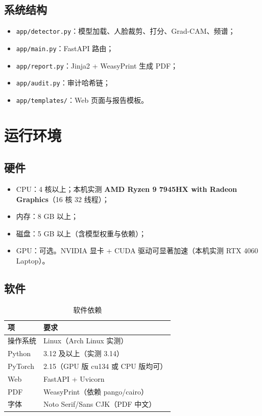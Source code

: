 \documentclass[12pt,a4paper]{article}
\begin{document}
\subsection{系统结构}

\begin{itemize}
  \item \texttt{app/detector.py}：模型加载、人脸裁剪、打分、Grad-CAM、频谱；
  \item \texttt{app/main.py}：FastAPI 路由；
  \item \texttt{app/report.py}：Jinja2 + WeasyPrint 生成 PDF；
  \item \texttt{app/audit.py}：审计哈希链；
  \item \texttt{app/templates/}：Web 页面与报告模板。
\end{itemize}

\section{运行环境}

\subsection{硬件}

\begin{itemize}
  \item CPU：4 核以上；本机实测 \textbf{AMD Ryzen 9 7945HX with Radeon Graphics}（16 核 32 线程）；
  \item 内存：8 GB 以上；
  \item 磁盘：5 GB 以上（含模型权重与依赖）；
  \item GPU：可选。NVIDIA 显卡 + CUDA 驱动可显著加速（本机实测 RTX 4060 Laptop）。
\end{itemize}

\subsection{软件}

\begin{table}[H]
\centering
\caption{软件依赖}
\small
\begin{tabular}{ll}
\toprule
项 & 要求 \\
\midrule
操作系统 & Linux（Arch Linux 实测）\\
Python & 3.12 及以上（实测 3.14）\\
PyTorch & 2.15（GPU 版 cu134 或 CPU 版均可）\\
Web & FastAPI + Uvicorn \\
PDF & WeasyPrint（依赖 pango/cairo）\\
字体 & Noto Serif/Sans CJK（PDF 中文）\\
\bottomrule
\end{tabular}
\end{table}
\end{document}
